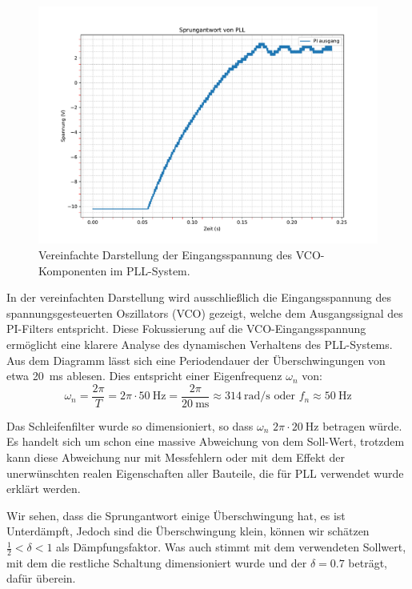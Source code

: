 \begin{figure}[H]
  \centering
  \includegraphics[width=0.8\linewidth]{Elektronik-Laborprotokoll_PLL/Abbildungen/sprungantwort.pdf}
  \caption{Vereinfachte Darstellung der Eingangsspannung des VCO-Komponenten im PLL-System.}
  \label{fig:spa}
\end{figure}

In der vereinfachten Darstellung wird ausschließlich die Eingangsspannung des spannungsgesteuerten Oszillators (VCO) gezeigt, welche dem Ausgangssignal des PI-Filters entspricht. Diese Fokussierung auf die VCO-Eingangsspannung ermöglicht eine klarere Analyse des dynamischen Verhaltens des PLL-Systems. Aus dem Diagramm lässt sich eine Periodendauer der Überschwingungen von etwa \SI{20}{\milli\second} ablesen. Dies entspricht einer Eigenfrequenz \(\omega_n\) von:
\[
\omega_n = \frac{2\pi}{T} = 2\pi \cdot \SI{50}{\hertz}= \frac{2\pi}{\SI{20}{\milli\second}} \approx \SI{314}{\radian\per\second} \text{ oder } f_n \approx \SI{50}{\hertz}
\]

Das Schleifenfilter wurde so dimensioniert, so dass $\omega_n$  $2\pi \cdot \SI{20}{\hertz}$ betragen würde. Es handelt sich um schon eine massive Abweichung von dem Soll-Wert, trotzdem kann diese Abweichung nur mit Messfehlern oder mit dem Effekt der unerwünschten realen Eigenschaften aller Bauteile, die für PLL verwendet wurde erklärt werden.

Wir sehen, dass die Sprungantwort einige Überschwingung hat, es ist Unterdämpft, Jedoch sind die Überschwingung klein, können wir schätzen $\frac{1}{2}<\delta<1$ als Dämpfungsfaktor. Was auch stimmt mit dem verwendeten Sollwert, mit dem die restliche Schaltung dimensioniert wurde und der $\delta=0.7$ beträgt, dafür überein.


